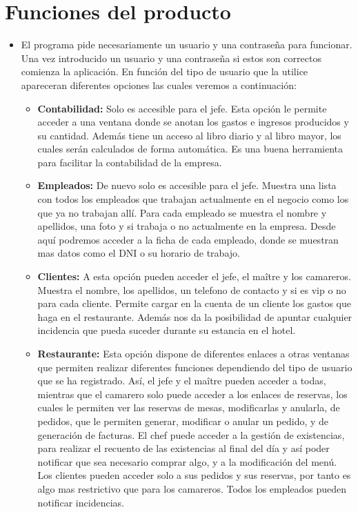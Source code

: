 \documentclass[spanish,a4paper,11pt, twoside]{report}	%
\begin{document}
\section{Funciones del producto}
	\begin{itemize}
		\item El programa pide necesariamente un usuario y una contraseña para funcionar. Una vez introducido un usuario y una contraseña si estos son correctos comienza la aplicación. En función del tipo de usuario que la utilice apareceran diferentes opciones las cuales veremos a continuación:
		\begin{itemize}
			\item \textbf{Contabilidad:} Solo es accesible para el jefe. Esta opción le permite acceder a una ventana donde se anotan los gastos e ingresos producidos y su cantidad. Además tiene un acceso al libro diario y al libro mayor, los cuales serán calculados de forma automática. Es una buena herramienta para facilitar la contabilidad de la empresa.
			\item \textbf{Empleados:} De nuevo solo es accesible para el jefe. Muestra una lista con todos los empleados que trabajan actualmente en el negocio como los que ya no trabajan allí. Para cada empleado se muestra el nombre y apellidos, una foto y si trabaja o no actualmente en la empresa. Desde aquí podremos acceder a la ficha de cada empleado, donde se muestran mas datos como el DNI o su horario de trabajo.
			\item \textbf{Clientes:} A esta opción pueden acceder el jefe, el maître y los camareros. Muestra el nombre, los apellidos, un telefono de contacto y si es vip o no para cada cliente. Permite cargar en la cuenta de un cliente los gastos que haga en el restaurante. Además nos da la posibilidad de apuntar cualquier incidencia que pueda suceder durante su estancia en el hotel.
			\item \textbf{Restaurante:} Esta opción dispone de diferentes enlaces a otras ventanas que permiten realizar diferentes funciones dependiendo del tipo de usuario que se ha registrado. Así, el jefe y el maître pueden acceder a todas, mientras que el camarero solo puede acceder a los enlaces de reservas, los cuales le permiten ver las reservas de mesas, modificarlas y anularla, de pedidos, que le permiten generar, modificar o anular un pedido, y de generación de facturas. El chef puede acceder a la gestión de existencias, para realizar el recuento de las existencias al final del día y así poder notificar que sea necesario comprar algo, y a la modificación del menú. Los clientes pueden acceder solo a sus pedidos y sus reservas, por tanto es algo mas restrictivo que para los camareros. Todos los empleados pueden notificar incidencias.

\end{itemize}
\end{itemize}
\end{document}
